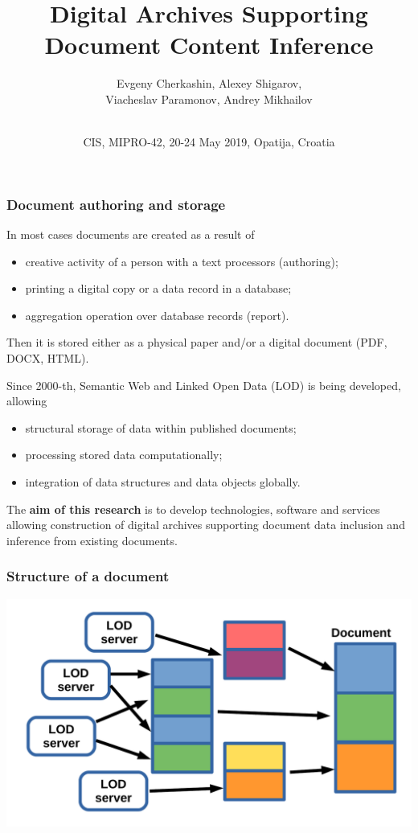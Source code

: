 \documentclass[10pt]{beamer}
\begin{document}
\title[Digital archives with AI]{Digital Archives Supporting Document Content Inference}
\author[E.~Cherkashin, A.~Shigarov, V.~Paramonov, A.~Mikhailov]{Evgeny Cherkashin,
Alexey Shigarov,\\
Viacheslav Paramonov,
Andrey Mikhailov}
\date[2019]{{}\\[1.5cm]
CIS, MIPRO-42,
20-24 May 2019, Opatija, Croatia
}
\maketitle

\begin{frame}
  \frametitle{Document authoring and storage}
  In most cases documents are created as a result of
  \begin{itemize}
  \item creative activity of a person with a text processors (authoring);
  \item printing a digital copy or a data record in a database;
  \item aggregation operation over database records (report).
  \end{itemize}
  Then it is stored either as a physical paper and/or a digital document (PDF, DOCX, HTML).

  Since 2000-th, Semantic Web and Linked Open Data (LOD) is being developed, allowing
  \begin{itemize}
  \item structural storage of data within published documents;
  \item processing stored data computationally;
  \item integration of data structures and data objects globally.
  \end{itemize}

  The \textbf{aim of this research} is to develop technologies, software and services allowing construction of digital archives supporting document data inclusion and inference from existing documents.
\end{frame}

\begin{frame}
  \frametitle{Structure of a document}
  \centering
  \includegraphics[width=1\linewidth]{document-structural-view.pdf}
\end{frame}
\end{document}
